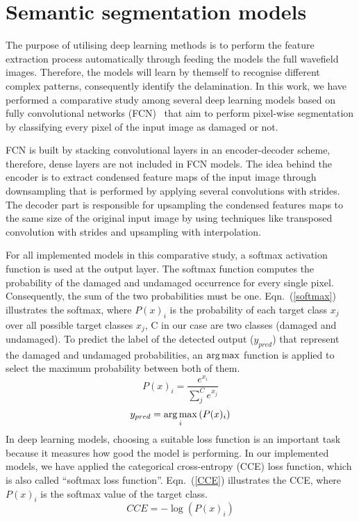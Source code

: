 \section{Semantic segmentation models}
\label{section:semantic_segmentation}
The purpose of utilising deep learning methods is to perform the feature extraction process automatically through feeding the models the full wavefield images.
Therefore, the models will learn by themself to recognise different complex patterns, consequently identify the delamination. 
In this work, we have performed a comparative study among several deep learning models based on fully convolutional networks (FCN)~\cite{shelhamer2017fully} that aim to perform pixel-wise segmentation by classifying every pixel of the input image as damaged or not. 

FCN is built by stacking convolutional layers in an encoder-decoder scheme, therefore, dense layers are not included in FCN models. 
The idea behind the encoder is to extract condensed feature maps of the input image through downsampling that is performed by applying several convolutions with strides.
The decoder part is responsible for upsampling the condensed features maps to the same size of the original input image by using techniques like transposed convolution with strides and upsampling with interpolation.


For all implemented models in this comparative study, a softmax activation function is used at the output layer.
The softmax function computes the probability of the damaged and undamaged occurrence for every single pixel.
Consequently, the sum of the two probabilities must be one. 
Eqn.~(\ref{softmax}) illustrates the softmax, where \(P(x)_{i}\) is the probability of each target class \(x_{j}\) over all possible target classes \(x_{j}\), C in our case are two classes  (damaged and undamaged).
To predict the label of the detected output (\(y_{pred}\)) that represent the damaged and undamaged probabilities, an \(\operatorname*{arg\,max}\) function is applied to select the maximum probability between both of them.
	\begin{equation}
		P(x)_{i} = \frac{e^{x_{i}}}{\sum_{j}^{C} e^{x_{j}}}
		\label{softmax}
	\end{equation} 
	\begin{equation}
		y_{pred} = \operatorname*{arg\,max}_{i}\left( P(x)_{i} \right)
		\label{argmax}
	\end{equation}
In deep learning models, choosing a suitable loss function is an important task because it measures how good the model is performing.
In our implemented models, we have applied the categorical cross-entropy (CCE) loss function, which is also called \enquote{softmax loss function}.
Eqn.~(\ref{CCE}) illustrates the CCE, where \( P(x)_{i}\) is the softmax value of the target class. 
	\begin{equation}
	CCE = -\log\left( P(x)_{i} \right)
	\label{CCE}
	\end{equation}

